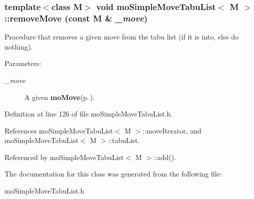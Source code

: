 \subsubsection{\setlength{\rightskip}{0pt plus 5cm}template$<$class M$>$ void {\bf mo\-Simple\-Move\-Tabu\-List}$<$ M $>$::remove\-Move (const M \& {\em \_\-move})\hspace{0.3cm}{\tt  [inline, private]}}\label{classmo_simple_move_tabu_list_d0}


Procedure that removes a given move from the tabu list (if it is into, else do nothing). 

\begin{Desc}
\item[Parameters:]
\begin{description}
\item[{\em \_\-move}]A given {\bf mo\-Move}{\rm (p.\,\pageref{classmo_move})}. \end{description}
\end{Desc}


Definition at line 126 of file mo\-Simple\-Move\-Tabu\-List.h.

References mo\-Simple\-Move\-Tabu\-List$<$ M $>$::move\-Iterator, and mo\-Simple\-Move\-Tabu\-List$<$ M $>$::tabu\-List.

Referenced by mo\-Simple\-Move\-Tabu\-List$<$ M $>$::add().

The documentation for this class was generated from the following file:\begin{CompactItemize}
\item 
mo\-Simple\-Move\-Tabu\-List.h\end{CompactItemize}
